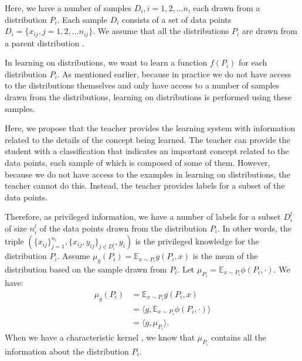 \documentclass[12pt]{article}
\begin{document}
	Here, we have a number of samples $D_i, i = 1, 2, \ldots n$, each drawn from a distribution $P_i$. Each sample $D_i$ consists of a set of data points $D_i = \{x_{ij}, j = 1, 2, \ldots n_{ij}\}$. We assume that all the distributions $P_i$ are drawn from a parent distribution \cite{muandet2012domain}.
	
	In learning on distributions, we want to learn a function $f(P_i)$ for each distribution $P_i$. As mentioned earlier, because in practice we do not have access to the distributions themselves and only have access to a number of samples drawn from the distributions, learning on distributions is performed using these samples.
	
	Here, we propose that the teacher provides the learning system with information related to the details of the concept being learned. The teacher can provide the student with a classification that indicates an important concept related to the data points, each sample of which is composed of some of them. However, because we do not have access to the examples in learning on distributions, the teacher cannot do this. Instead, the teacher provides labels for a subset of the data points.
	
	Therefore, as privileged information, we have a number of labels for a subset $D_i^l$ of size $n_i^l$ of the data points drawn from the distribution $P_i$. In other words, the triple $(\{x_{ij}\}_{j=1}^{n_i}, \{x_{ij}, y_{ij}\}_{j \in D_i^l}, y_i)$ is the privileged knowledge for the distribution $P_i$. Assume $\mu_g(P_i) = \mathbb{E}_{x \sim P_i} g(P_i, x)$ is the mean of the distribution based on the sample drawn from $P_i$. Let $\mu_{P_i} = \mathbb{E}_{x \sim P_i} \phi(P_i, \cdot)$. We have:
	\begin{align}
		\mu_g(P_i) &= \mathbb{E}_{x \sim P_i} g(P_i, x) \\
		&= \langle g, \mathbb{E}_{x \sim P_i} \phi(P_i, \cdot) \rangle \\
		&= \langle g, \mu_{P_i} \rangle.
	\end{align}
	When we have a characteristic kernel \cite{smola2007hilbert}, we know that $\mu_{P_i}$ contains all the information about the distribution $P_i$.
	
\end{document}
